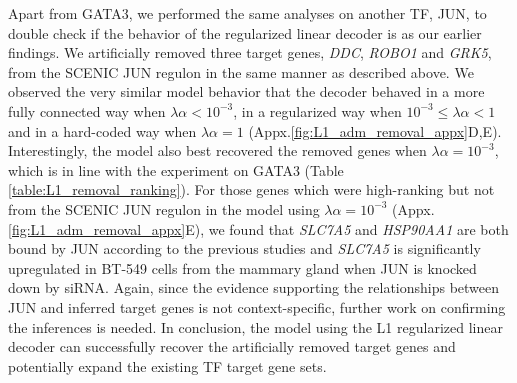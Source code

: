 Apart from GATA3, we performed the same analyses on another TF, JUN, to double check if the behavior of the regularized linear decoder is as our earlier findings. We artificially removed three target genes, \textit{DDC}, \textit{ROBO1} and \textit{GRK5}, from the SCENIC JUN regulon in the same manner as described above. We observed the very similar model behavior that the decoder behaved in a more fully connected way when $\lambda\alpha < 10^{-3}$, in a regularized way when $10^{-3} \leq \lambda\alpha < 1$ and in a hard-coded way when $\lambda\alpha = 1$ (Appx.\ref{fig:L1_adm_removal_appx}D,E). Interestingly, the model also best recovered the removed genes when $\lambda\alpha = 10^{-3}$, which is in line with the experiment on GATA3 (Table \ref{table:L1_removal_ranking}). For those genes which were high-ranking but not from the SCENIC JUN regulon in the model using $\lambda\alpha = 10^{-3}$ (Appx.\ref{fig:L1_adm_removal_appx}E), we found that \textit{SLC7A5} and \textit{HSP90AA1} are both bound by JUN according to the previous studies\cite{ENCODE2004,ENCODE2011,Rouillard2016,Lachmann2010} and \textit{SLC7A5} is significantly upregulated in BT-549 cells from the mammary gland when JUN is knocked down by siRNA\cite{Feng2020}. Again, since the evidence supporting the relationships between JUN and inferred target genes is not context-specific, further work on confirming the inferences is needed. In conclusion, the model using the L1 regularized linear decoder can successfully recover the artificially removed target genes and potentially expand the existing TF target gene sets.\vspace{3cm}

